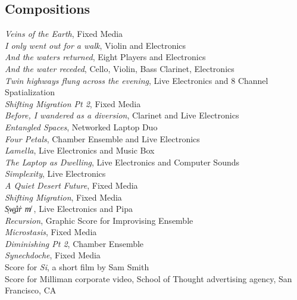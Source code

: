 \documentclass[12pt, a4paper]{article}
\newcommand{\years}[1]{\marginnote{\scriptsize #1}}
\begin{document}
\subsection*{Compositions}
\years{2024} 
\textit{Veins of the Earth}, Fixed Media \\
\years{2017}
\textit{I only went out for a walk}, Violin and Electronics\\
\textit{And the waters returned}, Eight Players and Electronics \\
\textit{And the water receded}, Cello, Violin, Bass Clarinet, Electronics \\
\years{2016} 
\textit{Twin highways flung across the evening}, Live Electronics and 8 Channel Spatialization \\
\textit{Shifting Migration Pt 2}, Fixed Media \\
\textit{Before, I wandered as a diversion}, Clarinet and Live Electronics\\
\textit{Entangled Spaces}, Networked Laptop Duo \\
\textit{Four Petals}, Chamber Ensemble and Live Electronics\\
\textit{Lamella}, Live Electronics and Music Box\\
\textit{The Laptop as Dwelling}, Live Electronics and Computer Sounds\\
\textit{Simplexity}, Live Electronics \\
\textit{A Quiet Desert Future}, Fixed Media\\
\textit{Shifting Migration}, Fixed Media \\
\years{2015}
\textit{S̜w͚a̎r̍  m̸}  , Live Electronics and Pipa\\  
\textit{Recursion}, Graphic Score for Improvising Ensemble \\  
\textit{Microstasis}, Fixed Media\\  
\textit{Diminishing Pt 2}, Chamber Ensemble \\  
\textit{Synechdoche}, Fixed Media \\  
Score for \textit{Si}, a short film by Sam Smith\\  
Score for Milliman corporate video, School of Thought advertising agency, San Francisco, CA\\  
\years{2012} 
\end{document}
